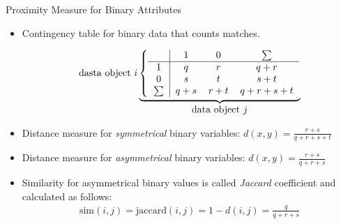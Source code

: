 \begin{frame}{Proximity Measure for Binary Attributes}
	\begin{itemize}
		\item Contingency table for binary data that counts matches.
		      \begin{center}
			      \vspace{-2em}
			      \[
				      \text{dasta object}~i\underbrace{
					      \left\{\begin{tabular}{ c | c c c }
						             & $1$   & $0$   & $\sum$    \\ \hline
						      $1$    & $q$   & $r$   & $q+r$     \\
						      $0$    & $s$   & $t$   & $s+t$     \\
						      $\sum$ & $q+s$ & $r+t$ & $q+r+s+t$
					      \end{tabular}\right.}_{\let\scriptstyle\textstyle\substack{\text{data object}~j}}
			      \]
		      \end{center}
		\item Distance measure for \textit{symmetrical} binary variables: $d(x,y) = \frac{r+s}{q+r+s+t}$
		\item Distance measure for \textit{asymmetrical} binary variables: $d(x,y) = \frac{r+s}{q+r+s}$
		\item Similarity for asymmetrical binary values is called \textit{Jaccard} coefficient and calculated as follows:
		      \begin{align*}
			      \text{sim}(i,j)=\text{jaccard}(i,j)=1-d(i,j)=\frac{q}{q+r+s}
		      \end{align*}
	\end{itemize}
\end{frame}

